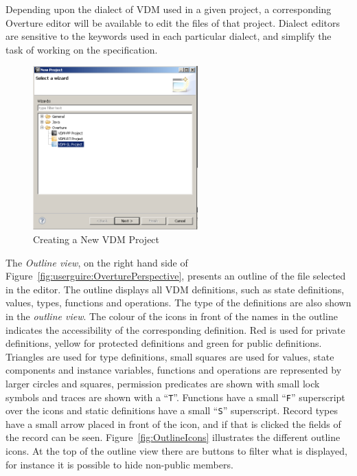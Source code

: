 \documentclass{overturerepchap}
\begin{document}
Depending upon the dialect of VDM used in a given project,
a corresponding Overture editor will be available to edit the files of
that project. Dialect editors are sensitive to the keywords used in
each particular dialect, and simplify the task of working on the
specification.

\begin{figure}[!h]
\begin{center}
  \caption[labelInTOC]{Creating a New VDM Project}
  \label{fig:userguide:newOvertureProjectSL}
  \includegraphics[width=2.5in]{figures/newovertureSLproject}
\end{center}
\end{figure}


The \emph{Outline view}, on the right hand side of 
Figure~\ref{fig:userguire:OverturePerspective}, presents an outline of
the file selected
in the editor. The outline displays all VDM definitions, such as
state definitions, values, types, functions and operations. The
type of the definitions are also shown in the \emph{outline view}.
The colour of the icons in front of the names in the outline
indicates the accessibility of the corresponding definition. Red is
used for private definitions, yellow for protected definitions and
green for public definitions. Triangles are used for
type definitions, small squares are used for values, state components
and instance variables, functions and operations are represented by
larger circles and squares, permission predicates are shown with small
lock symbols and traces are shown with a
``\texttt{T}''. Functions have a small ``\texttt{F}'' superscript over the
icons and static definitions have a small ``\texttt{S}'' superscript.
Record types have a small arrow placed in front of the
icon, and if that is clicked the fields of the record can be seen.
Figure~\ref{fig:OutlineIcons} illustrates the different outline icons.
At the top of the outline view there are buttons to filter what is displayed,
for instance it is possible to hide non-public members.
\end{document}
